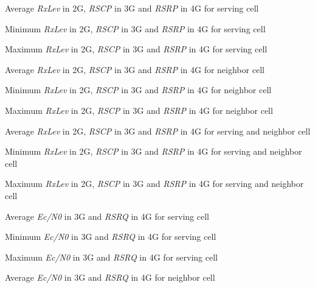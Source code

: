 %
{Average \textit{RxLev} in 2G, \textit{RSCP} in 3G and \textit{RSRP} in 4G for serving cell}

%
{Minimum \textit{RxLev} in 2G, \textit{RSCP} in 3G and \textit{RSRP} in 4G  for serving cell}

%
{Maximum \textit{RxLev} in 2G, \textit{RSCP} in 3G and \textit{RSRP} in 4G for serving cell}


%
{Average \textit{RxLev} in 2G, \textit{RSCP} in 3G and \textit{RSRP} in 4G for neighbor cell}

%
{Minimum \textit{RxLev} in 2G, \textit{RSCP} in 3G and \textit{RSRP} in 4G  for neighbor cell}

%
{Maximum \textit{RxLev} in 2G, \textit{RSCP} in 3G and \textit{RSRP} in 4G for neighbor cell}


%
{Average \textit{RxLev} in 2G, \textit{RSCP} in 3G and \textit{RSRP} in 4G for serving and neighbor cell}

%
{Minimum \textit{RxLev} in 2G, \textit{RSCP} in 3G and \textit{RSRP} in 4G for serving and neighbor cell}

%
{Maximum \textit{RxLev} in 2G, \textit{RSCP} in 3G and \textit{RSRP} in 4G for serving and neighbor cell}



%
{Average \textit{Ec/N0} in 3G and \textit{RSRQ} in 4G for serving cell}

%
{Minimum \textit{Ec/N0} in 3G and \textit{RSRQ} in 4G  for serving cell}

%
{Maximum \textit{Ec/N0} in 3G and \textit{RSRQ} in 4G for serving cell}


%
{Average \textit{Ec/N0} in 3G and \textit{RSRQ} in 4G for neighbor cell}

